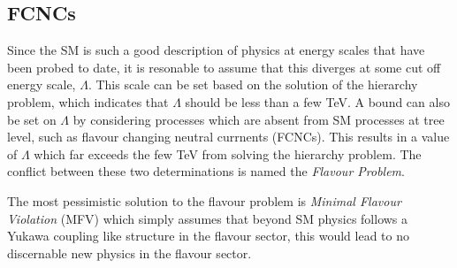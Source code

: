 \subsection{FCNCs}
Since the SM is such a good description of physics at energy scales that have been probed to date,
it is resonable to assume that this diverges at some cut off energy scale, $\Lambda$.
This scale can be set based on the solution of the hierarchy problem, which indicates that
$\Lambda$ should be less than a few TeV.
A bound can also be set on $\Lambda$ by considering processes which are absent from SM processes at
tree level, such as flavour changing neutral currnents (FCNCs).
This results in a value of $\Lambda$ which far exceeds the few TeV from solving the hierarchy
problem.
The conflict between these two determinations is named the \emph{Flavour Problem}.

The most pessimistic solution to the flavour problem is \emph{Minimal Flavour Violation} (MFV)
which simply assumes that beyond SM physics follows a Yukawa coupling like structure in the flavour
sector, this would lead to no discernable new physics in the flavour sector.






%





